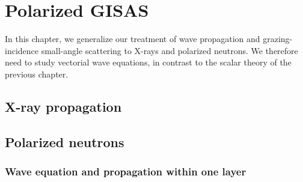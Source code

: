 
\chapter{Polarized GISAS}  \label{SPol}

In this chapter,
we generalize our treatment of wave propagation and
grazing-incidence small-angle scattering
to X-rays and polarized neutrons.
We therefore need to study vectorial wave equations,
in contrast to the scalar theory of the previous chapter.

\section{X-ray propagation}\label{Sxray}

\MissingSection


\section{Polarized neutrons}\label{Snpol}




\subsection{Wave equation and propagation within one layer}

